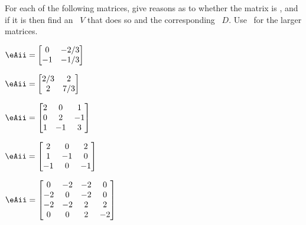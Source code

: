 \begin{exercise} \label{ex:} 
For each of the following matrices, give reasons as to whether the matrix is , and if it is then find an ~\(V\) that does so and the corresponding ~\(D\).
Use \script\ for the larger matrices.

\begin{parts}
\item \(\eAii=\begin{bmatrix} 0&-2/3
\\-1&-1/3 \end{bmatrix}\)

\item \(\eAii=\begin{bmatrix} 2/3&2
\\2&7/3 \end{bmatrix}\)

\item \(\eAii=\begin{bmatrix} 2&0&1
\\0&2&-1
\\1&-1&3 \end{bmatrix}\)

\item \(\eAii=\begin{bmatrix} 2&0&2
\\1&-1&0
\\-1&0&-1 \end{bmatrix}\)

\item \(\eAii=\begin{bmatrix} 0&-2&-2&0
\\-2&0&-2&0
\\-2&-2&2&2
\\0&0&2&-2 \end{bmatrix}\)


\end{parts}
\end{exercise}
